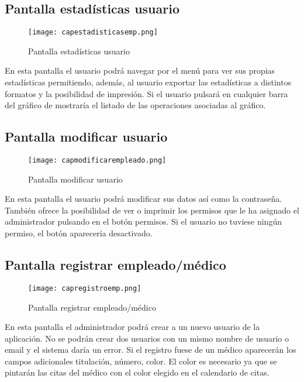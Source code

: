 \newpage
\subsection {Pantalla estadísticas usuario}

\begin{figure}[!htb]
  \centering
    \texttt{[image: capestadisticasemp.png]}
  \caption{Pantalla estadísticas usuario}
  \label{a}
\end{figure}

En esta pantalla el usuario podrá navegar por el menú para ver sus propias estadísticas permitiendo, además, al usuario exportar las estadísticas a distintos formatos y la posibilidad de impresión. Si el usuario pulsará en cualquier barra del gráfico de mostraría el listado de las operaciones asociadas al gráfico.

\newpage
\subsection {Pantalla modificar usuario}

\begin{figure}[!htb]
  \centering
    \texttt{[image: capmodificarempleado.png]}
  \caption{Pantalla modificar usuario}
  \label{a}
\end{figure}

En esta pantalla el usuario podrá modificar sus datos así como la contraseña. También ofrece la posibilidad de ver o imprimir los permisos que le ha asignado el administrador pulsando en el botón permisos. Si el usuario no tuviese ningún permiso, el botón aparecería desactivado.

\newpage
\subsection {Pantalla registrar empleado/médico}

\begin{figure}[!htb]
  \centering
    \texttt{[image: capregistroemp.png]}
  \caption{Pantalla registrar empleado/médico}
  \label{a}
\end{figure}

En esta pantalla el administrador podrá crear a un nuevo usuario de la aplicación. No se podrán crear dos usuarios con un mismo nombre de usuario o email y el sistema daría un error. Si el registro fuese de un médico aparecerán los campos adicionales titulación, número, color. El color es necesario ya que se pintarán las citas del médico con el color elegido en el calendario de citas.

